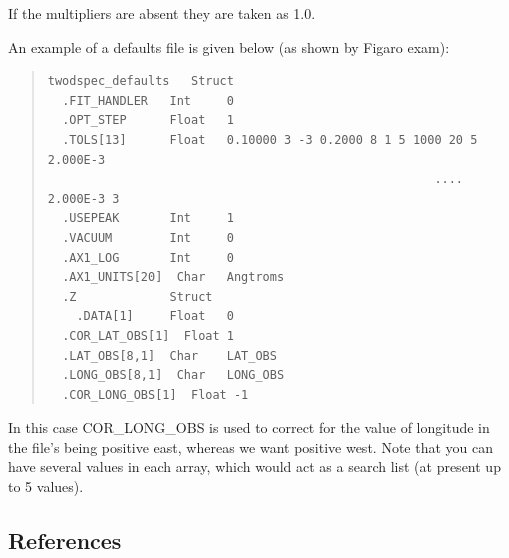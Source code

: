 \documentclass[11pt,twoside]{article}
\begin{document}
If the multipliers are absent they are taken as 1.0.

An example of a defaults file is given below (as shown by Figaro exam):
\begin{quote}\begin{verbatim}
twodspec_defaults   Struct
  .FIT_HANDLER   Int     0
  .OPT_STEP      Float   1
  .TOLS[13]      Float   0.10000 3 -3 0.2000 8 1 5 1000 20 5 2.000E-3
                                                      .... 2.000E-3 3
  .USEPEAK       Int     1
  .VACUUM        Int     0
  .AX1_LOG       Int     0
  .AX1_UNITS[20]  Char   Angtroms
  .Z             Struct
    .DATA[1]     Float   0
  .COR_LAT_OBS[1]  Float 1
  .LAT_OBS[8,1]  Char    LAT_OBS
  .LONG_OBS[8,1]  Char   LONG_OBS
  .COR_LONG_OBS[1]  Float -1
\end{verbatim}\end{quote}
In this case COR\_LONG\_OBS is used to correct for the value of
longitude in the file's being positive east, whereas we want positive
west. Note that you can have several values in each array, which would
act as a search list (at present up to 5 values).

\newpage
\subsection{References}
\end{document}
